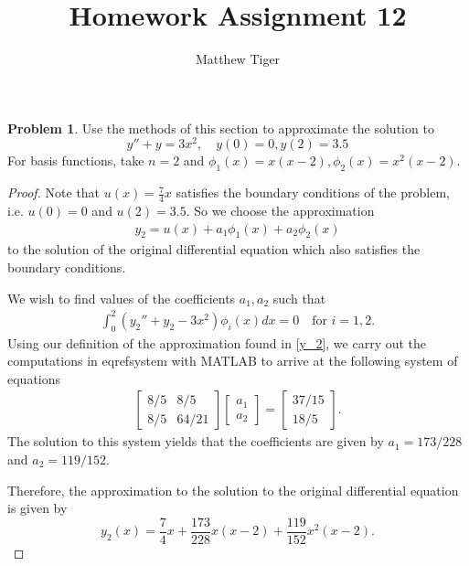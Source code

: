 \documentclass[12pt]{article}
\title{Homework Assignment 12}
\author{Matthew Tiger}
\theoremstyle{definition}
\newtheorem{problem}{Problem}
\begin{document}
\maketitle


\begin{problem}
  Use the methods of this section to approximate the solution to
  \[
    y'' + y = 3x^2, \quad y(0) = 0, y(2) = 3.5
  \]
  For basis functions, take $n=2$ and $\phi_1(x) = x(x-2), \phi_2(x) = x^2(x-2)$.
\end{problem}

\begin{proof}
  Note that $u(x) = \frac{7}{4}x$ satisfies the boundary conditions of the problem,
  i.e. $u(0) = 0$ and $u(2) = 3.5$. So we choose the approximation
  \begin{align}\label{y_2}
    y_2 = u(x) + a_1 \phi_1(x) + a_2 \phi_2(x)
  \end{align}
  to the solution of the original differential equation which also satisfies
  the boundary conditions.

  We wish to find values of the coefficients $a_1, a_2$ such that
  \begin{align}\label{system}
    \int_0^2 \left(y_2'' + y_2 - 3x^2\right)\phi_i(x)dx = 0 \quad \text{for $i = 1,2.$}
  \end{align}
  Using our definition of the approximation found in \eqref{y_2}, we carry out the
  computations in eqref{system} with MATLAB to arrive at the following system
  of equations
  \begin{align*}
    \begin{bmatrix}
      8/5 & 8/5 \\
      8/5 & 64/21
    \end{bmatrix}
    \begin{bmatrix}
      a_1 \\
      a_2
    \end{bmatrix} =
    \begin{bmatrix}
      37/15 \\
      18/5
    \end{bmatrix}.
  \end{align*}
  The solution to this system yields that the coefficients
  are given by $a_1 = 173/228$ and $a_2 = 119/152$.

  Therefore, the approximation to the solution to the original differential equation
  is given by
  \[
    y_2(x) = \frac{7}{4}x + \frac{173}{228}x(x-2) + \frac{119}{152}x^2(x-2).
  \]
\end{proof}
\end{document}
